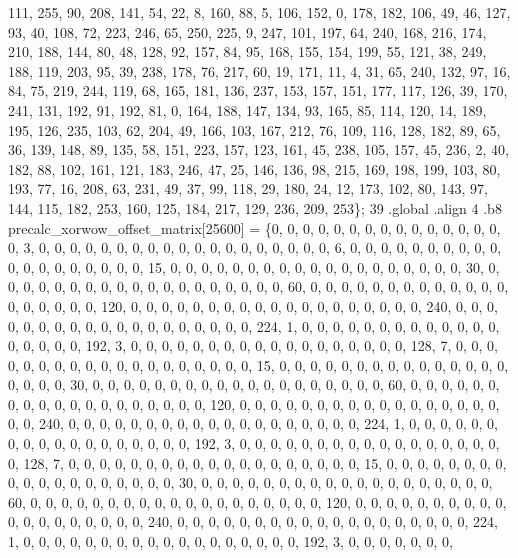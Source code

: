 \begin{DoxyCode}
       111, 255, 90, 208, 141, 54, 22, 8, 160, 88, 5, 106, 152, 0, 178, 182, 106, 49, 46, 127, 93, 40, 108, 72, 223,
       246, 65, 250, 225, 9, 247, 101, 197, 64, 240, 168, 216, 174, 210, 188, 144, 80, 48, 128, 92, 157, 84, 95,
       168, 155, 154, 199, 55, 121, 38, 249, 188, 119, 203, 95, 39, 238, 178, 76, 217, 60, 19, 171, 11, 4, 31, 65,
       240, 132, 97, 16, 84, 75, 219, 244, 119, 68, 165, 181, 136, 237, 153, 157, 151, 177, 117, 126, 39, 170, 241,
       131, 192, 91, 192, 81, 0, 164, 188, 147, 134, 93, 165, 85, 114, 120, 14, 189, 195, 126, 235, 103, 62, 204,
       49, 166, 103, 167, 212, 76, 109, 116, 128, 182, 89, 65, 36, 139, 148, 89, 135, 58, 151, 223, 157, 123, 161,
       45, 238, 105, 157, 45, 236, 2, 40, 182, 88, 102, 161, 121, 183, 246, 47, 25, 146, 136, 98, 215, 169, 198, 199,
       103, 80, 193, 77, 16, 208, 63, 231, 49, 37, 99, 118, 29, 180, 24, 12, 173, 102, 80, 143, 97, 144, 115, 182,
       253, 160, 125, 184, 217, 129, 236, 209, 253\};
39 .global .align 4 .b8 precalc\_xorwow\_offset\_matrix[25600] = \{0, 0, 0, 0, 0, 0, 0, 0, 0, 0, 0, 0, 0, 0, 0, 0,
       3, 0, 0, 0, 0, 0, 0, 0, 0, 0, 0, 0, 0, 0, 0, 0, 0, 0, 0, 0, 6, 0, 0, 0, 0, 0, 0, 0, 0, 0, 0, 0, 0, 0, 0, 0,
       0, 0, 0, 0, 15, 0, 0, 0, 0, 0, 0, 0, 0, 0, 0, 0, 0, 0, 0, 0, 0, 0, 0, 0, 30, 0, 0, 0, 0, 0, 0, 0, 0, 0, 0,
       0, 0, 0, 0, 0, 0, 0, 0, 0, 60, 0, 0, 0, 0, 0, 0, 0, 0, 0, 0, 0, 0, 0, 0, 0, 0, 0, 0, 0, 120, 0, 0, 0, 0, 0,
       0, 0, 0, 0, 0, 0, 0, 0, 0, 0, 0, 0, 0, 0, 240, 0, 0, 0, 0, 0, 0, 0, 0, 0, 0, 0, 0, 0, 0, 0, 0, 0, 0, 0, 224,
       1, 0, 0, 0, 0, 0, 0, 0, 0, 0, 0, 0, 0, 0, 0, 0, 0, 0, 0, 192, 3, 0, 0, 0, 0, 0, 0, 0, 0, 0, 0, 0, 0, 0, 0,
       0, 0, 0, 0, 128, 7, 0, 0, 0, 0, 0, 0, 0, 0, 0, 0, 0, 0, 0, 0, 0, 0, 0, 0, 0, 15, 0, 0, 0, 0, 0, 0, 0, 0, 0,
       0, 0, 0, 0, 0, 0, 0, 0, 0, 0, 30, 0, 0, 0, 0, 0, 0, 0, 0, 0, 0, 0, 0, 0, 0, 0, 0, 0, 0, 0, 60, 0, 0, 0, 0,
       0, 0, 0, 0, 0, 0, 0, 0, 0, 0, 0, 0, 0, 0, 0, 120, 0, 0, 0, 0, 0, 0, 0, 0, 0, 0, 0, 0, 0, 0, 0, 0, 0, 0, 0,
       240, 0, 0, 0, 0, 0, 0, 0, 0, 0, 0, 0, 0, 0, 0, 0, 0, 0, 0, 0, 224, 1, 0, 0, 0, 0, 0, 0, 0, 0, 0, 0, 0, 0, 0,
       0, 0, 0, 0, 0, 192, 3, 0, 0, 0, 0, 0, 0, 0, 0, 0, 0, 0, 0, 0, 0, 0, 0, 0, 0, 128, 7, 0, 0, 0, 0, 0, 0, 0, 0,
       0, 0, 0, 0, 0, 0, 0, 0, 0, 0, 0, 15, 0, 0, 0, 0, 0, 0, 0, 0, 0, 0, 0, 0, 0, 0, 0, 0, 0, 0, 0, 30, 0, 0, 0,
       0, 0, 0, 0, 0, 0, 0, 0, 0, 0, 0, 0, 0, 0, 0, 0, 60, 0, 0, 0, 0, 0, 0, 0, 0, 0, 0, 0, 0, 0, 0, 0, 0, 0, 0, 0,
       120, 0, 0, 0, 0, 0, 0, 0, 0, 0, 0, 0, 0, 0, 0, 0, 0, 0, 0, 0, 240, 0, 0, 0, 0, 0, 0, 0, 0, 0, 0, 0, 0, 0, 0,
       0, 0, 0, 0, 0, 224, 1, 0, 0, 0, 0, 0, 0, 0, 0, 0, 0, 0, 0, 0, 0, 0, 0, 0, 0, 192, 3, 0, 0, 0, 0, 0, 0, 0,

\end{DoxyCode}
